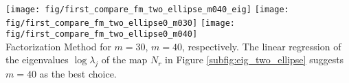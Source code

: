\documentclass[10pt,xcolor={dvipsnames}]{beamer}
\theoremstyle{plain}
\theoremstyle{plain}
\begin{document}
\begin{frame}
 \frametitle{}
{
\texttt{[image: fig/first\_compare\_fm\_two\_ellipse\_m040\_eig]}
}
{
\texttt{[image: fig/first\_compare\_fm\_two\_ellipse0\_m030]}
}
{
\texttt{[image: fig/first\_compare\_fm\_two\_ellipse0\_m040]}
}\\
Factorization Method for $m=30$, $m=40$, respectively. The linear regression of the
eigenvalues $\log\lambda_j$ of the map $N_r$ in Figure \ref{subfig:eig_two_ellipse} suggests $m=40$ as the best choice.
\end{frame}
\end{document}
